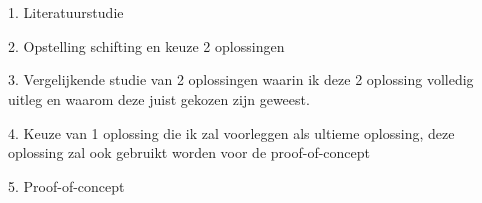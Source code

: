 
\chapter{}
\label{ch:methodologie}


1. Literatuurstudie

2. Opstelling schifting en keuze 2 oplossingen


3. Vergelijkende studie van 2 oplossingen waarin ik deze 2 oplossing volledig uitleg en waarom deze juist gekozen zijn geweest.


4. Keuze van 1 oplossing die ik zal voorleggen als ultieme oplossing, deze oplossing zal ook gebruikt worden voor de proof-of-concept

5. Proof-of-concept
